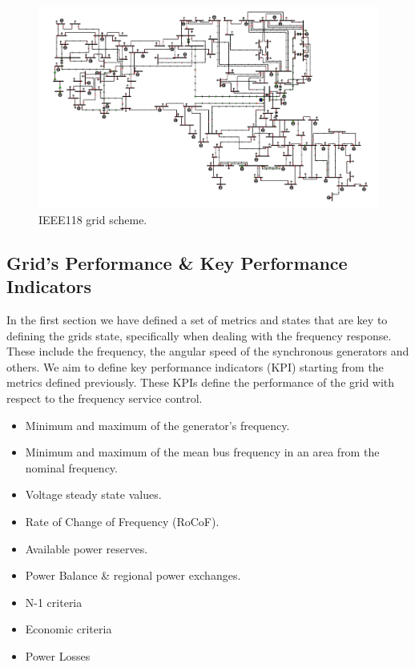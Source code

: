 \documentclass{article}
\begin{document}
\begin{figure}[h!]
    \centering
    \includegraphics[width=1\textwidth]{pictures/IEEE118.png}
    \caption{IEEE118 grid scheme. \cite{grids:ieee118}}
    \label{fig:kundur}
\end{figure}

\subsection{Grid's Performance \& Key Performance Indicators}

In the first section we have defined a set of metrics and states that are key to defining the grids state, specifically when dealing with the frequency response. These include the frequency, the angular speed of the synchronous generators and others. We aim to define key performance indicators (KPI) starting from the metrics defined previously. These KPIs define the performance of the grid with respect to the frequency service control. 

\begin{itemize}
    \item Minimum and maximum of the generator's frequency.
    \item Minimum and maximum of the mean bus frequency in an area from the nominal frequency.
    \item Voltage steady state values.
    \item Rate of Change of Frequency (RoCoF).
    \item Available power reserves.
    \item Power Balance \& regional power exchanges.
    \item N-1 criteria
    \item Economic criteria
    \item Power Losses
\end{itemize}
\end{document}
